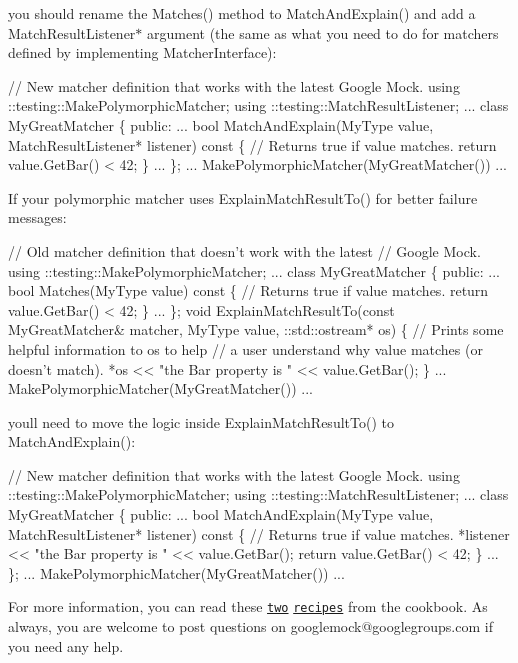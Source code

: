 you should rename the {\ttfamily Matches()} method to {\ttfamily Match\+And\+Explain()} and add a {\ttfamily Match\+Result\+Listener$\ast$} argument (the same as what you need to do for matchers defined by implementing {\ttfamily Matcher\+Interface})\+: 
\begin{DoxyCode}
// New matcher definition that works with the latest Google Mock.
using ::testing::MakePolymorphicMatcher;
using ::testing::MatchResultListener;
...
class MyGreatMatcher \{
 public:
  ...
  bool MatchAndExplain(MyType value,
                       MatchResultListener* listener) const \{
    // Returns true if value matches.
    return value.GetBar() < 42;
  \}
  ...
\};
... MakePolymorphicMatcher(MyGreatMatcher()) ...
\end{DoxyCode}


If your polymorphic matcher uses {\ttfamily Explain\+Match\+Result\+To()} for better failure messages\+: 
\begin{DoxyCode}
// Old matcher definition that doesn't work with the latest
// Google Mock.
using ::testing::MakePolymorphicMatcher;
...
class MyGreatMatcher \{
 public:
  ...
  bool Matches(MyType value) const \{
    // Returns true if value matches.
    return value.GetBar() < 42;
  \}
  ...
\};
void ExplainMatchResultTo(const MyGreatMatcher& matcher,
                          MyType value,
                          ::std::ostream* os) \{
  // Prints some helpful information to os to help
  // a user understand why value matches (or doesn't match).
  *os << "the Bar property is " << value.GetBar();
\}
... MakePolymorphicMatcher(MyGreatMatcher()) ...
\end{DoxyCode}


you\textquotesingle{}ll need to move the logic inside {\ttfamily Explain\+Match\+Result\+To()} to {\ttfamily Match\+And\+Explain()}\+: 
\begin{DoxyCode}
// New matcher definition that works with the latest Google Mock.
using ::testing::MakePolymorphicMatcher;
using ::testing::MatchResultListener;
...
class MyGreatMatcher \{
 public:
  ...
  bool MatchAndExplain(MyType value,
                       MatchResultListener* listener) const \{
    // Returns true if value matches.
    *listener << "the Bar property is " << value.GetBar();
    return value.GetBar() < 42;
  \}
  ...
\};
... MakePolymorphicMatcher(MyGreatMatcher()) ...
\end{DoxyCode}


For more information, you can read these \href{http://code.google.com/p/googlemock/wiki/V1_6_CookBook#Writing_New_Monomorphic_Matchers}{\tt two} \href{http://code.google.com/p/googlemock/wiki/V1_6_CookBook#Writing_New_Polymorphic_Matchers}{\tt recipes} from the cookbook. As always, you are welcome to post questions on {\ttfamily googlemock@googlegroups.\+com} if you need any help.

